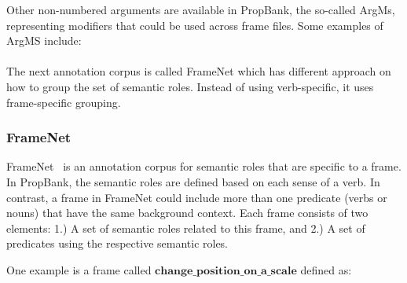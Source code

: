Other non-numbered arguments are available in PropBank, the so-called ArgMs, representing modifiers that could be used across frame files. Some examples of ArgMS include:
\\
\\

The next annotation corpus is called FrameNet which has different approach on how to group the set of semantic roles. Instead of using verb-specific, it uses frame-specific grouping.

\subsubsection{FrameNet}
FrameNet~\citep{baker1998berkeley} is an annotation corpus for semantic roles that are specific to a frame. In PropBank, the semantic roles are defined based on each sense of a verb. In contrast, a frame in FrameNet could include more than one predicate (verbs or nouns) that have the same background context. Each frame consists of two elements: 1.) A set of semantic roles related to this frame, and 2.) A set of predicates using the respective semantic roles.

One example is a frame called $\mathbf{change\_position\_on\_a\_scale}$ defined as:
\\
\\

